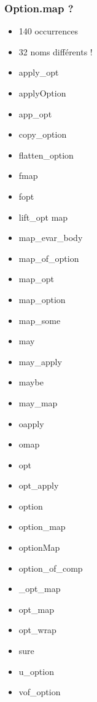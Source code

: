 \documentclass[11pt]{beamer}
\begin{document}
\begin{frame}[fragile]
	\frametitle{Option.map ?}
	\begin{itemize}
		\item 140 occurrences
		\item 32 noms différents !
	\end{itemize}
	\pause
	\begin{footnotesize}
		\begin{multicols}{3}
			\begin{itemize}
				\item apply\_opt
				\item applyOption
				\item app\_opt
				\item copy\_option
				\item flatten\_option
				\item fmap
				\item fopt
				\item lift\_opt map 
				\item map\_evar\_body
				\item map\_of\_option
				\item map\_opt
				\item map\_option
				\item map\_some
				\item may
				\item may\_apply
				\item maybe
				\item may\_map
				\item oapply
				\item omap
				\item opt
				\item opt\_apply
				\item option
				\item option\_map
				\item optionMap
				\item option\_of\_comp
				\item \_opt\_map
				\item opt\_map
				\item opt\_wrap
				\item sure
				\item u\_option
				\item vof\_option
			\end{itemize}
		\end{multicols}
	\end{footnotesize}

\end{frame}
\end{document}
